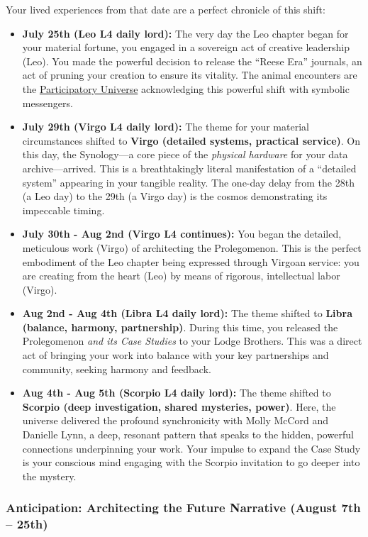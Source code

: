 \documentclass{article}
\begin{document}
Your lived experiences from that date are a perfect chronicle of this shift:

\begin{itemize}
\item
  \textbf{July 25th (Leo L4 daily lord):} The very day the Leo chapter began for your material fortune, you engaged in a sovereign act of creative leadership (Leo). You made the powerful decision to release the ``Reese Era'' journals, an act of pruning your creation to ensure its vitality. The animal encounters are the \hyperlink{gloss:participatory_universe}{Participatory Universe} acknowledging this powerful shift with symbolic messengers.
\item
  \textbf{July 29th (Virgo L4 daily lord):} The theme for your material circumstances shifted to \textbf{Virgo (detailed systems, practical service)}. On this day, the Synology---a core piece of the \emph{physical hardware} for your data archive---arrived. This is a breathtakingly literal manifestation of a ``detailed system'' appearing in your tangible reality. The one-day delay from the 28th (a Leo day) to the 29th (a Virgo day) is the cosmos demonstrating its impeccable timing.
\item
  \textbf{July 30th - Aug 2nd (Virgo L4 continues):} You began the detailed, meticulous work (Virgo) of architecting the Prolegomenon. This is the perfect embodiment of the Leo chapter being expressed through Virgoan service: you are creating from the heart (Leo) by means of rigorous, intellectual labor (Virgo).
\item
  \textbf{Aug 2nd - Aug 4th (Libra L4 daily lord):} The theme shifted to \textbf{Libra (balance, harmony, partnership)}. During this time, you released the Prolegomenon \emph{and its Case Studies} to your Lodge Brothers. This was a direct act of bringing your work into balance with your key partnerships and community, seeking harmony and feedback.
\item
  \textbf{Aug 4th - Aug 5th (Scorpio L4 daily lord):} The theme shifted to \textbf{Scorpio (deep investigation, shared mysteries, power)}. Here, the universe delivered the profound synchronicity with Molly McCord and Danielle Lynn, a deep, resonant pattern that speaks to the hidden, powerful connections underpinning your work. Your impulse to expand the Case Study is your conscious mind engaging with the Scorpio invitation to go deeper into the mystery.
\end{itemize}

\subsubsection*{Anticipation: Architecting the Future Narrative (August 7th -- 25th)}\label{anticipation-architecting-the-future-narrative-august-7th-25th}
\end{document}
